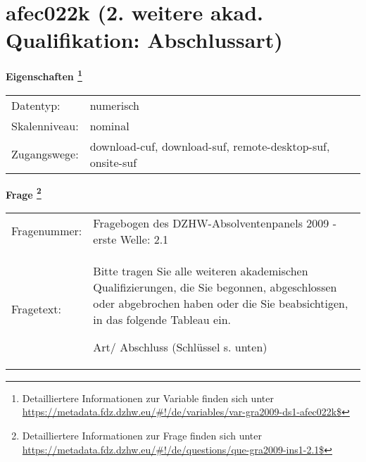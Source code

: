 
    \setcounter{footnote}{0}

    \vspace*{-1.8cm}
	\section{afec022k (2. weitere akad. Qualifikation: Abschlussart)}
	\label{section:afec022k}



    \vspace*{0.5cm}
    \noindent\textbf{Eigenschaften
	\footnote{Detailliertere Informationen zur Variable finden sich unter
		\url{https://metadata.fdz.dzhw.eu/\#!/de/variables/var-gra2009-ds1-afec022k$}}}\\
	\begin{tabularx}{\hsize}{@{}lX}
	Datentyp: & numerisch \\
	Skalenniveau: & nominal \\
	Zugangswege: &
	  download-cuf, 
	  download-suf, 
	  remote-desktop-suf, 
	  onsite-suf
 \\
    \end{tabularx}



				\vspace*{0.5cm}
                \noindent\textbf{Frage
	                \footnote{Detailliertere Informationen zur Frage finden sich unter
		              \url{https://metadata.fdz.dzhw.eu/\#!/de/questions/que-gra2009-ins1-2.1$}}}\\
				\begin{tabularx}{\hsize}{@{}lX}
					Fragenummer: &
					  Fragebogen des DZHW-Absolventenpanels 2009 - erste Welle:
					  2.1
 \\
					Fragetext: & Bitte tragen Sie alle weiteren akademischen Qualifizierungen, die Sie begonnen, abgeschlossen oder abgebrochen haben oder die Sie beabsichtigen, in das folgende Tableau ein.\par  Art/ Abschluss (Schlüssel s. unten) \\
				\end{tabularx}





